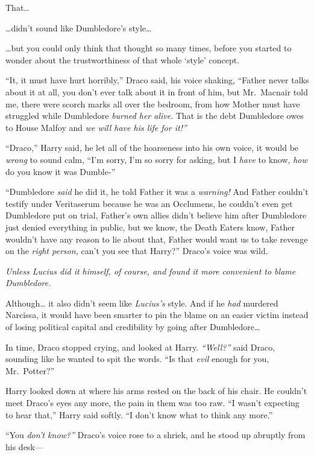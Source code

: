 That\ldots{}

\ldots{}didn't sound like Dumbledore's style\ldots{}

\ldots{}but you could only think that thought so many times, before you
started to wonder about the trustworthiness of that whole `style'
concept.

``It, it must have hurt horribly,'' Draco said, his voice shaking,
``Father never talks about it at all, you don't ever talk about it in
front of him, but Mr.~Macnair told me, there were scorch marks all over
the bedroom, from how Mother must have struggled while Dumbledore
\emph{burned her alive}. That is the debt Dumbledore owes to House
Malfoy and \emph{we will have his life for it!''}

``Draco,'' Harry said, he let all of the hoarseness into his own voice,
it would be \emph{wrong} to sound calm, ``I'm sorry, I'm so sorry for
asking, but I \emph{have} to know, \emph{how} do you know it was
Dumble-''

``Dumbledore \emph{said} he did it, he told Father it was a
\emph{warning!} And Father couldn't testify under Veritaserum because he
was an Occlumens, he couldn't even get Dumbledore put on trial, Father's
own allies didn't believe him after Dumbledore just denied everything in
public, but we know, the Death Eaters know, Father wouldn't have any
reason to lie about that, Father would want us to take revenge on the
\emph{right person,} can't you see that Harry?'' Draco's voice was wild.

\emph{Unless Lucius did it himself, of course, and found it more
convenient to blame Dumbledore.}

Although\ldots{} it also didn't seem like \emph{Lucius's} style. And if
he \emph{had} murdered Narcissa, it would have been smarter to pin the
blame on an easier victim instead of losing political capital and
credibility by going after Dumbledore\ldots{}

In time, Draco stopped crying, and looked at Harry. \emph{``Well?''}
said Draco, sounding like he wanted to spit the words. ``Is that
\emph{evil} enough for you, Mr.~Potter?''

Harry looked down at where his arms rested on the back of his chair. He
couldn't meet Draco's eyes any more, the pain in them was too raw. ``I
wasn't expecting to hear that,'' Harry said softly. ``I don't know what
to think any more.''

``You \emph{don't know?''} Draco's voice rose to a shriek, and he stood
up abruptly from his desk---

